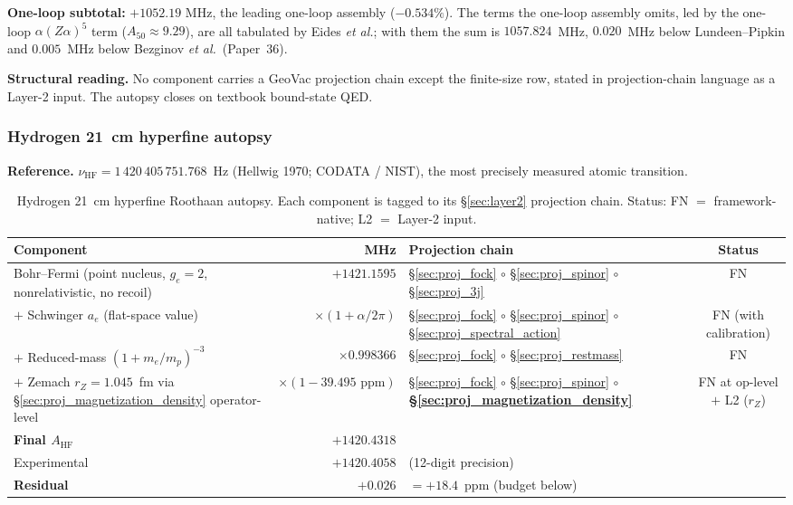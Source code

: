 \documentclass[11pt]{article}
\begin{document}
\textbf{One-loop subtotal:} $+1052.19$ MHz, the leading one-loop
assembly ($-0.534\%$).  The terms the one-loop assembly omits, led by
the one-loop $\alpha(Z\alpha)^5$ term ($A_{50}\approx 9.29$), are all
tabulated by Eides \emph{et al.}; with them the sum is $1057.824$~MHz,
$0.020$~MHz below Lundeen--Pipkin and $0.005$~MHz below Bezginov
\emph{et al.}\ (Paper~36).

\textbf{Structural reading.}  No component carries a GeoVac projection
chain except the finite-size row, stated in projection-chain language
as a Layer-2 input.  The autopsy closes on textbook bound-state QED.

\subsubsection{Hydrogen 21~cm hyperfine autopsy}
\label{sec:autopsy_21cm}

\textbf{Reference.} $\nu_\text{HF} = 1\,420\,405\,751.768$~Hz (Hellwig
1970; CODATA / NIST), the most precisely measured atomic transition.

\begin{table}[h]
\centering\small
\begin{tabular}{p{4cm} r p{6cm} c}
\toprule
Component & MHz & Projection chain & Status \\
\midrule
Bohr--Fermi (point nucleus, $g_e=2$, nonrelativistic, no recoil) & $+1421.1595$ &
\S\ref{sec:proj_fock} $\circ$ \S\ref{sec:proj_spinor} $\circ$
\S\ref{sec:proj_3j} & FN \\
$+$ Schwinger $a_e$ (flat-space value) & $\times (1+\alpha/2\pi)$ &
\S\ref{sec:proj_fock} $\circ$ \S\ref{sec:proj_spinor} $\circ$
\S\ref{sec:proj_spectral_action} & FN (with calibration) \\
$+$ Reduced-mass $(1+m_e/m_p)^{-3}$ & $\times 0.998366$ &
\S\ref{sec:proj_fock} $\circ$ \S\ref{sec:proj_restmass} & FN \\
$+$ Zemach $r_Z=1.045$~fm via \S\ref{sec:proj_magnetization_density}
operator-level & $\times (1 - 39.495 \text{~ppm})$ &
\S\ref{sec:proj_fock} $\circ$ \S\ref{sec:proj_spinor} $\circ$
\textbf{\S\ref{sec:proj_magnetization_density}} & FN at op-level $+$ L2 ($r_Z$) \\
\midrule
\textbf{Final $A_\text{HF}$} & $+1420.4318$ & & \\
Experimental & $+1420.4058$ & (12-digit precision) & \\
\textbf{Residual} & $+0.026$ & $= +18.4$~ppm (budget below) & \\
\bottomrule
\end{tabular}
\caption{Hydrogen 21~cm hyperfine Roothaan autopsy.  Each component is
tagged to its \S\ref{sec:layer2} projection chain.  Status: FN $=$
framework-native; L2 $=$ Layer-2 input.}
\label{tab:autopsy_21cm}
\end{table}
\end{document}
